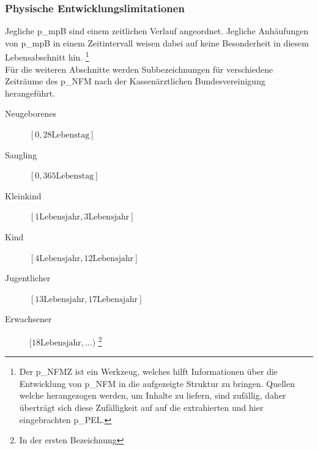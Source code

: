 \begin{itemize}
\subsubsection{Physische Entwicklungslimitationen}
Jegliche \gls{p_mpB} sind einem zeitlichen Verlauf angeordnet. Jegliche Anhäufungen von \gls{p_mpB} in einem Zeitintervall weisen dabei auf keine Besonderheit in diesem Lebensabschnitt hin. \footnote{Der \gls{p_NFMZ} ist ein Werkzeug, welches hilft Informationen über die Entwicklung von \gls{p_NFM} in die aufgezeigte Struktur zu bringen. Quellen welche herangezogen werden, um Inhalte zu liefern, sind zufällig, daher überträgt sich diese Zufälligkeit auf auf die extrahierten und hier eingebrachten \gls{p_PEL}.}%
\\

Für die weiteren Abschnitte werden Subbezeichnungen für verschiedene Zeiträume des \gls{p_NFM} nach der Kassenärztlichen Bundesvereinigung herangeführt.
\begin{description}
	\item[Neugeborenes] $[0, 28 \text{Lebenstag}]$
	\item[Saugling] $[0,365 \text{Lebenstag}]$
	\item[Kleinkind] $[1 \text{Lebensjahr}, 3 \text{Lebensjahr}]$
	\item[Kind] $[4 \text{Lebensjahr}, 12 \text{Lebensjahr}]$
	\item[Jugentlicher] $[13 \text{Lebensjahr}, 17 \text{Lebensjahr}]$
	\item[Erwachsener] $[18 \text{Lebensjahr}, \dots )$ \footnote{In der ersten Bezeichnung}
\end{description} 



\end{itemize}

